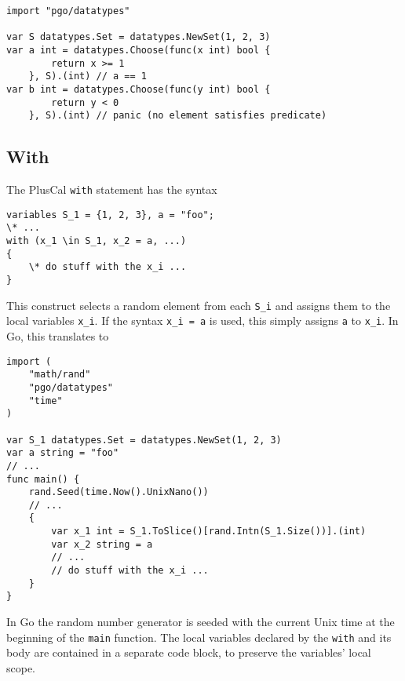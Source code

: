 \noindent
\begin{minipage}[t]{\textwidth}
\begin{lstlisting}[language=golang]
import "pgo/datatypes"

var S datatypes.Set = datatypes.NewSet(1, 2, 3)
var a int = datatypes.Choose(func(x int) bool {
		return x >= 1
	}, S).(int) // a == 1
var b int = datatypes.Choose(func(y int) bool {
		return y < 0
	}, S).(int) // panic (no element satisfies predicate)
\end{lstlisting}
\end{minipage}

\subsection{With}
The PlusCal \texttt{with} statement has the syntax

\noindent
\begin{minipage}[t]{\textwidth}
\begin{lstlisting}[language=pcal]
variables S_1 = {1, 2, 3}, a = "foo";
\* ...
with (x_1 \in S_1, x_2 = a, ...)
{
	\* do stuff with the x_i ...
}
\end{lstlisting}
\end{minipage}

This construct selects a random element from each \texttt{S\_i} and assigns them to the local variables \texttt{x\_i}. If the syntax \texttt{x\_i = a} is used, this simply assigns \texttt{a} to \texttt{x\_i}. In Go, this translates to

\noindent
\begin{minipage}[t]{\textwidth}
\begin{lstlisting}[language=golang]
import (
	"math/rand"
	"pgo/datatypes"
	"time"
)

var S_1 datatypes.Set = datatypes.NewSet(1, 2, 3)
var a string = "foo"
// ...
func main() {
	rand.Seed(time.Now().UnixNano())
	// ...
	{
		var x_1 int = S_1.ToSlice()[rand.Intn(S_1.Size())].(int)
		var x_2 string = a
		// ...
		// do stuff with the x_i ...
	}
}
\end{lstlisting}
\end{minipage}

In Go the random number generator is seeded with the current Unix time at the beginning of the \texttt{main} function. The local variables declared by the \texttt{with} and its body are contained in a separate code block, to preserve the variables' local scope.

